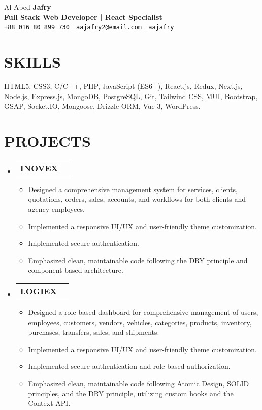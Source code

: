 \documentclass[letterpaper,11pt]{article}
\makeatletter
\newcommand{\resumeItem}[1]{
  \item\small{
    {#1 \vspace{-1pt}}
  }
}
\newcommand{\resumeProjectHeading}[2]{
    \item
    \begin{tabular*}{\textwidth}{l@{\extracolsep{\fill}}r}
      #1 & {\color{dark-grey}} \\
    \end{tabular*}\vspace{-4pt}
}
\newcommand{\resumeSubHeadingListStart}{\begin{itemize}[leftmargin=0in, label={}]}
\newcommand{\resumeSubHeadingListEnd}{\end{itemize}}
\newcommand{\resumeItemListStart}{\begin{itemize}}
\newcommand{\resumeItemListEnd}{\end{itemize}\vspace{0pt}}
\makeatother
\begin{document}
\begin{center}
    {\Huge Al Abed \textbf{\Huge Jafry}} \\ \vspace{5pt}
    \textbf{\Large\textcolor{dark-grey}{Full Stack Web Developer | React Specialist}} \\ \vspace{3pt}
    \small \faPhone* \texttt{+88 016 80 899 730} \hspace{1pt} $|$
    \hspace{1pt} \faEnvelope \hspace{2pt} \texttt{aajafry2@email.com} \hspace{1pt} $|$ 
    \hspace{1pt} \faGithub \hspace{2pt} \texttt{aajafry} \hspace{1pt}
\end{center}

\section{SKILLS}
 \begin{itemize}[leftmargin=0in, label={}]
    \small{\item{
    {HTML5, CSS3, C/C++, PHP, JavaScript (ES6+), React.js, Redux, Next.js, Node.js, Express.js, MongoDB, PostgreSQL, Git, Tailwind CSS, MUI, Bootstrap, GSAP, Socket.IO, Mongoose, Drizzle ORM, Vue 3, WordPress.}
    }}
 \end{itemize}

\section{PROJECTS}
    \resumeSubHeadingListStart
      \resumeProjectHeading
        {\textbf{INOVEX}} {}
          \resumeItemListStart
            \resumeItem{Designed a comprehensive management system for services, clients, quotations, orders, sales, accounts, and workflows for both clients and agency employees.}
            \resumeItem{Implemented a responsive UI/UX and user-friendly theme customization.}
            \resumeItem{Implemented secure authentication.}
            \resumeItem{Emphasized clean, maintainable code following the DRY principle and component-based architecture.}
          \resumeItemListEnd
      \resumeProjectHeading
        {\textbf{LOGIEX}} {}
          \resumeItemListStart
            \resumeItem{Designed a role-based dashboard for comprehensive management of users, employees, customers, vendors, vehicles, categories, products, inventory, purchases, transfers, sales, and shipments.}
            \resumeItem{Implemented a responsive UI/UX and user-friendly theme customization.}
            \resumeItem{Implemented secure authentication and role-based authorization.}
            \resumeItem{Emphasized clean, maintainable code following Atomic Design, SOLID principles, and the DRY principle, utilizing custom hooks and the Context API.}
          \resumeItemListEnd
    \resumeSubHeadingListEnd
\end{document}
